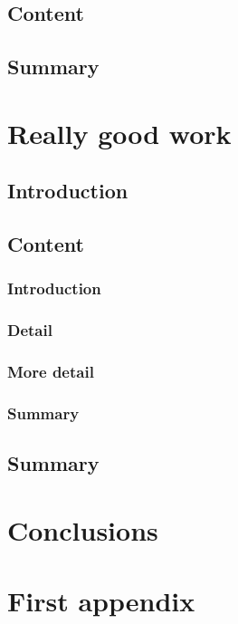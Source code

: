 \documentclass[calibri,thesis]{uom_thesis_casson} %
\begin{document}
  \section{Content}
  \lipsum[1-2] \cite{ref:jCAS09,ref:jCAS09a,ref:jCAS10} \lipsum[3-5]
  
  \section{Summary}
  \lipsum[6]
  
  \printbibliography[title={References},heading=subbibintoc] %
  
  
\chapter{Really good work}

  \section{Introduction}
  \lipsum[1] 
  
  \section{Content}
    \subsection{Introduction}
	\lipsum[1]
	
	\subsection{Detail}
    \lipsum[1-2] \cite{ref:jCAS10,ref:jCAS09,ref:jCAS09a} \lipsum[3-5]
    
	\subsection{More detail}
	\lipsum[1-2] \cite{ref:jCAS10,ref:jCAS09,ref:jCAS09a} \lipsum[3-5]
	
	\subsection{Summary}
	\lipsum[1]
  
  \section{Summary}
  \lipsum[6]
  
  \printbibliography[title={References},heading=subbibintoc] %

  
\chapter{Conclusions}


\uomappendix 
\chapter{First appendix}
\lipsum[1-6]


\end{document}
